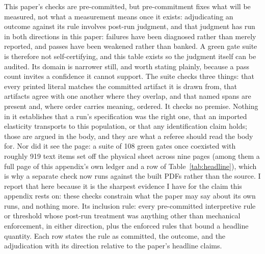 \documentclass[12pt]{article}
\begin{document}
This paper's checks are pre-committed, but pre-commitment fixes what will be measured, not what a measurement means once it exists: adjudicating an outcome against its rule involves post-run judgment, and that judgment has run in both directions in this paper: failures have been diagnosed rather than merely reported, and passes have been weakened rather than banked. A green gate suite is therefore not self-certifying, and this table exists so the judgment itself can be audited. Its domain is narrower still, and worth stating plainly, because a pass count invites a confidence it cannot support. The suite checks three things: that every printed literal matches the committed artifact it is drawn from, that artifacts agree with one another where they overlap, and that named spans are present and, where order carries meaning, ordered. It checks no premise. Nothing in it establishes that a run's specification was the right one, that an imported elasticity transports to this population, or that any identification claim holds; those are argued in the body, and they are what a referee should read the body for. Nor did it see the page: a suite of 108 green gates once coexisted with roughly 919 text items set off the physical sheet across nine pages (among them a full page of this appendix's own ledger and a row of Table~\ref{tab:headline}), which is why a separate check now runs against the built PDFs rather than the source. I report that here because it is the sharpest evidence I have for the claim this appendix rests on: these checks constrain what the paper may say about its own runs, and nothing more. Its inclusion rule: every pre-committed interpretive rule or threshold whose post-run treatment was anything other than mechanical enforcement, in either direction, plus the enforced rules that bound a headline quantity. Each row states the rule as committed, the outcome, and the adjudication with its direction relative to the paper's headline claims.
\end{document}
